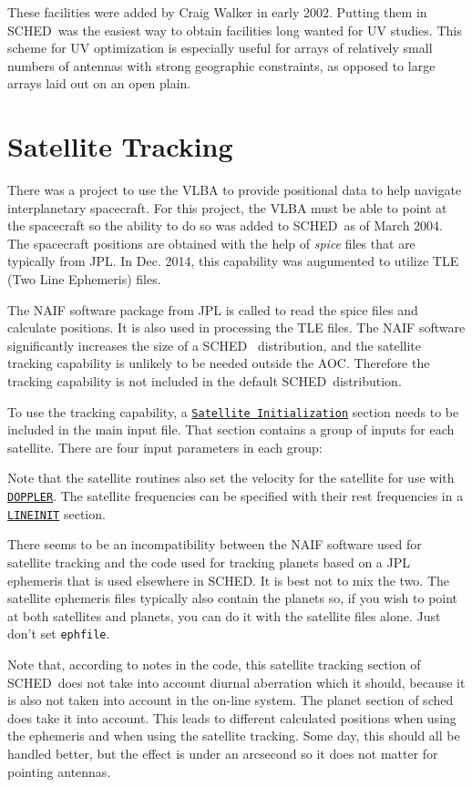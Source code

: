 \documentclass{report}
\newcommand{\schedb}{{\sc SCHED~}}
\begin{document}
These facilities were added by Craig Walker in early 2002.  Putting
them in \schedb was the easiest way to obtain facilities long wanted
for UV studies.  This scheme for UV optimization is especially useful
for arrays of relatively small numbers of antennas with strong
geographic constraints, as opposed to large arrays laid out on an open
plain.

\section{\label{SEC:SATEL}Satellite Tracking}

There was a project to use the VLBA to provide positional data to help
navigate interplanetary spacecraft.  For this project, the VLBA must
be able to point at the spacecraft so the ability to do so was
added to \schedb as of March 2004.  The spacecraft positions are
obtained with the help of {\sl spice} files that are typically from
JPL.  In Dec. 2014, this capability was augumented to utilize 
TLE (Two Line Ephemeris) files.

The NAIF software package from JPL is called to read the spice files
and calculate positions.  It is also used in processing the TLE files.
The NAIF software significantly increases the size of a \schedb
distribution, and the satellite tracking capability is unlikely to be
needed outside the AOC.  Therefore the tracking capability is not
included in the default \schedb distribution.

To use the tracking capability, a 
{\hyperref[SEC:SATINIT]{{\tt Satellite Initialization}}}
section needs to be included in the
main input file.  That section contains a group of inputs for each
satellite.  There are four input parameters in each group:

Note that the satellite routines also set the velocity for the
satellite for use with 
{\hyperref[MP:DOPPLER]{{\tt DOPPLER}}}.
The satellite frequencies can be specified with their rest frequencies
in a 
{\hyperref[MP:LINEINIT]{{\tt LINEINIT}}} section.

There seems to be an incompatibility between the NAIF software used for
satellite tracking and the code used for tracking planets based on a
JPL ephemeris that is used elsewhere in SCHED.  It is best not to mix
the two.  The satellite ephemeris files typically also contain the
planets so, if you wish to point at both satellites and planets, you
can do it with the satellite files alone.  Just don't set {\tt ephfile}.

Note that, according to notes in the code, this satellite tracking
section of \schedb does not take into account diurnal aberration which
it should, because it is also not taken into account in the on-line
system.  The planet section of sched does take it into account.  This
leads to different calculated positions when using the ephemeris and
when using the satellite tracking.  Some day, this should all be
handled better, but the effect is under an arcsecond so it does not
matter for pointing antennas.
\end{document}
